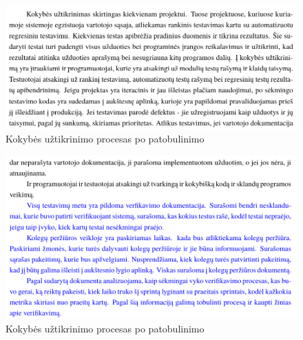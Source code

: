 \documentclass{VUMIFPSkursinis}
\begin{document}
\pagebreak

				\begin{figure}[!htbp]
					\includegraphics[scale=0.8]{img/kokybepotwo}
					\caption{Kokybės užtikrinimo procesas po patobulinimo} %
					\label{img:ProfilisPo}
				\end{figure}
				\begin{figure}[!htbp]
					\includegraphics[scale=0.8]{img/kokybepothree}
					\caption{Kokybės užtikrinimo procesas po patobulinimo} %
					\label{img:ProfilisPo}
				\end{figure}

\pagebreak
\end{document}
